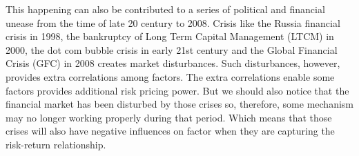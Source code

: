 This happening can also be contributed to a series of political and financial unease from the time of late 20 century to 2008.
Crisis like the Russia financial crisis in 1998, the bankruptcy of Long Term Capital Management (LTCM) in 2000, the dot com bubble crisis in early 21st century and the Global Financial Crisis (GFC) in 2008 creates market disturbances.
Such disturbances, however, provides extra correlations among factors.
The extra correlations enable some factors provides additional risk pricing power.
But we should also notice that the financial market has been disturbed by those crises so, therefore, some mechanism may no longer working properly during that period.
Which means that those crises will also have negative influences on factor when they are capturing the risk-return relationship.



